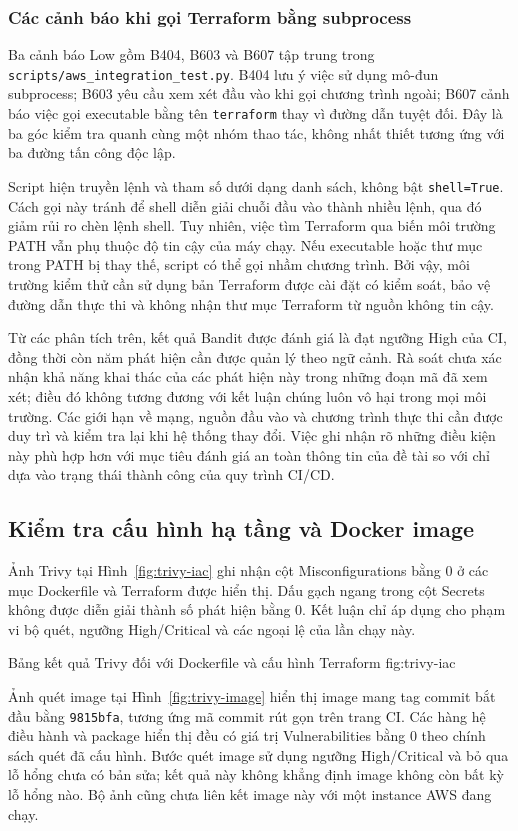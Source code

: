 \subsubsection{Các cảnh báo khi gọi Terraform bằng subprocess}
Ba cảnh báo Low gồm B404, B603 và B607 tập trung trong \nolinkurl{scripts/aws_integration_test.py}. B404 lưu ý việc sử dụng mô-đun subprocess; B603 yêu cầu xem xét đầu vào khi gọi chương trình ngoài; B607 cảnh báo việc gọi executable bằng tên \texttt{terraform} thay vì đường dẫn tuyệt đối. Đây là ba góc kiểm tra quanh cùng một nhóm thao tác, không nhất thiết tương ứng với ba đường tấn công độc lập.

Script hiện truyền lệnh và tham số dưới dạng danh sách, không bật \texttt{shell=True}. Cách gọi này tránh để shell diễn giải chuỗi đầu vào thành nhiều lệnh, qua đó giảm rủi ro chèn lệnh shell. Tuy nhiên, việc tìm Terraform qua biến môi trường PATH vẫn phụ thuộc độ tin cậy của máy chạy. Nếu executable hoặc thư mục trong PATH bị thay thế, script có thể gọi nhầm chương trình. Bởi vậy, môi trường kiểm thử cần sử dụng bản Terraform được cài đặt có kiểm soát, bảo vệ đường dẫn thực thi và không nhận thư mục Terraform từ nguồn không tin cậy.

Từ các phân tích trên, kết quả Bandit được đánh giá là đạt ngưỡng High của CI, đồng thời còn năm phát hiện cần được quản lý theo ngữ cảnh. Rà soát chưa xác nhận khả năng khai thác của các phát hiện này trong những đoạn mã đã xem xét; điều đó không tương đương với kết luận chúng luôn vô hại trong mọi môi trường. Các giới hạn về mạng, nguồn đầu vào và chương trình thực thi cần được duy trì và kiểm tra lại khi hệ thống thay đổi. Việc ghi nhận rõ những điều kiện này phù hợp hơn với mục tiêu đánh giá an toàn thông tin của đề tài so với chỉ dựa vào trạng thái thành công của quy trình CI/CD.

\subsection{Kiểm tra cấu hình hạ tầng và Docker image}
Ảnh Trivy tại Hình~\ref{fig:trivy-iac} ghi nhận cột Misconfigurations bằng 0 ở các mục Dockerfile và Terraform được hiển thị. Dấu gạch ngang trong cột Secrets không được diễn giải thành số phát hiện bằng 0. Kết luận chỉ áp dụng cho phạm vi bộ quét, ngưỡng High/Critical và các ngoại lệ của lần chạy này.

{Bảng kết quả Trivy đối với Dockerfile và cấu hình Terraform}
{fig:trivy-iac}

Ảnh quét image tại Hình~\ref{fig:trivy-image} hiển thị image mang tag commit bắt đầu bằng \texttt{9815bfa}, tương ứng mã commit rút gọn trên trang CI. Các hàng hệ điều hành và package hiển thị đều có giá trị Vulnerabilities bằng 0 theo chính sách quét đã cấu hình. Bước quét image sử dụng ngưỡng High/Critical và bỏ qua lỗ hổng chưa có bản sửa; kết quả này không khẳng định image không còn bất kỳ lỗ hổng nào. Bộ ảnh cũng chưa liên kết image này với một instance AWS đang chạy.

